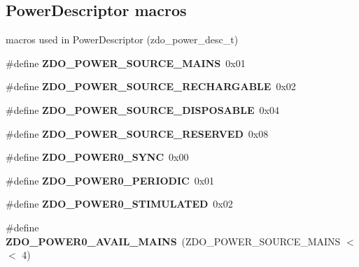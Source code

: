 \subsection*{Power\-Descriptor macros}
\label{_amgrpc8b2f63f47b11b1245f13496e262efc5}%
macros used in Power\-Descriptor (zdo\-\_\-power\-\_\-desc\-\_\-t) \begin{DoxyCompactItemize}
\item 
\hypertarget{group__zdo_gaf915c94ec813213961b3fc93c4c608ca}{\#define {\bfseries Z\-D\-O\-\_\-\-P\-O\-W\-E\-R\-\_\-\-S\-O\-U\-R\-C\-E\-\_\-\-M\-A\-I\-N\-S}~0x01}\label{group__zdo_gaf915c94ec813213961b3fc93c4c608ca}

\item 
\hypertarget{group__zdo_ga5096133eec6c50b31fdf5a994c1fc228}{\#define {\bfseries Z\-D\-O\-\_\-\-P\-O\-W\-E\-R\-\_\-\-S\-O\-U\-R\-C\-E\-\_\-\-R\-E\-C\-H\-A\-R\-G\-A\-B\-L\-E}~0x02}\label{group__zdo_ga5096133eec6c50b31fdf5a994c1fc228}

\item 
\hypertarget{group__zdo_ga9ba5e697f3da7fb0488d047676264436}{\#define {\bfseries Z\-D\-O\-\_\-\-P\-O\-W\-E\-R\-\_\-\-S\-O\-U\-R\-C\-E\-\_\-\-D\-I\-S\-P\-O\-S\-A\-B\-L\-E}~0x04}\label{group__zdo_ga9ba5e697f3da7fb0488d047676264436}

\item 
\hypertarget{group__zdo_gab21873d088d45d8f3aa0c534fabd824b}{\#define {\bfseries Z\-D\-O\-\_\-\-P\-O\-W\-E\-R\-\_\-\-S\-O\-U\-R\-C\-E\-\_\-\-R\-E\-S\-E\-R\-V\-E\-D}~0x08}\label{group__zdo_gab21873d088d45d8f3aa0c534fabd824b}

\item 
\hypertarget{group__zdo_ga21506c473239ac9f7fb08bd639581b71}{\#define {\bfseries Z\-D\-O\-\_\-\-P\-O\-W\-E\-R0\-\_\-\-S\-Y\-N\-C}~0x00}\label{group__zdo_ga21506c473239ac9f7fb08bd639581b71}

\item 
\hypertarget{group__zdo_ga14c775cfd03dad684f6f080383076764}{\#define {\bfseries Z\-D\-O\-\_\-\-P\-O\-W\-E\-R0\-\_\-\-P\-E\-R\-I\-O\-D\-I\-C}~0x01}\label{group__zdo_ga14c775cfd03dad684f6f080383076764}

\item 
\hypertarget{group__zdo_ga985110ef15923867842bee91e66e0b1f}{\#define {\bfseries Z\-D\-O\-\_\-\-P\-O\-W\-E\-R0\-\_\-\-S\-T\-I\-M\-U\-L\-A\-T\-E\-D}~0x02}\label{group__zdo_ga985110ef15923867842bee91e66e0b1f}

\item 
\hypertarget{group__zdo_gad07d6e180ee997547235aa5a113296a0}{\#define {\bfseries Z\-D\-O\-\_\-\-P\-O\-W\-E\-R0\-\_\-\-A\-V\-A\-I\-L\-\_\-\-M\-A\-I\-N\-S}~(Z\-D\-O\-\_\-\-P\-O\-W\-E\-R\-\_\-\-S\-O\-U\-R\-C\-E\-\_\-\-M\-A\-I\-N\-S $<$$<$ 4)}\label{group__zdo_gad07d6e180ee997547235aa5a113296a0}


\end{DoxyCompactItemize}
